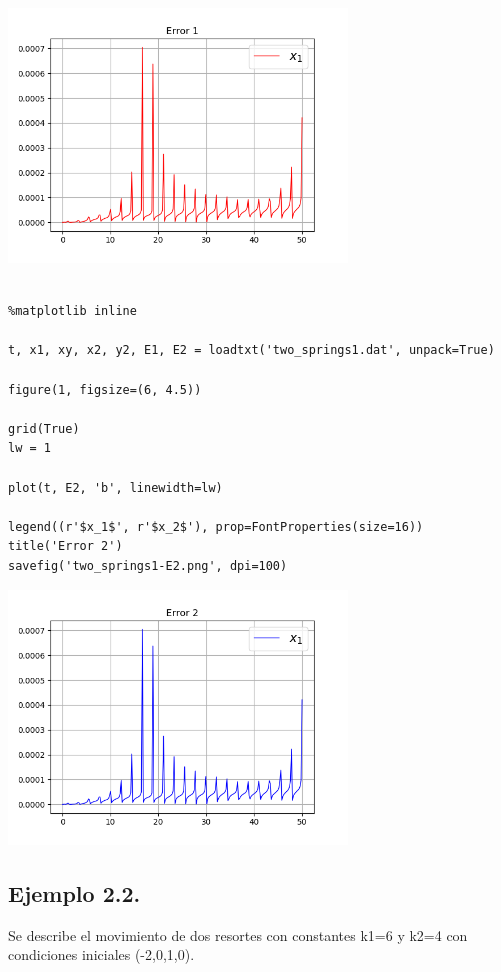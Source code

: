 \documentclass{article} %
\begin{document}
\begin{center}
 	\includegraphics[width=9cm]{two_springs1-E1.png}
 \end{center}




\begin{verbatim} 

%matplotlib inline

t, x1, xy, x2, y2, E1, E2 = loadtxt('two_springs1.dat', unpack=True)

figure(1, figsize=(6, 4.5))

grid(True)
lw = 1

plot(t, E2, 'b', linewidth=lw)

legend((r'$x_1$', r'$x_2$'), prop=FontProperties(size=16))
title('Error 2')
savefig('two_springs1-E2.png', dpi=100)

\end{verbatim}



\begin{center}
 	\includegraphics[width=9cm]{two_springs1-E2.png}
 \end{center}


\subsection{Ejemplo 2.2.}
Se describe el movimiento de dos resortes con constantes k1=6 y k2=4 con condiciones iniciales (-2,0,1,0).
\end{document}
